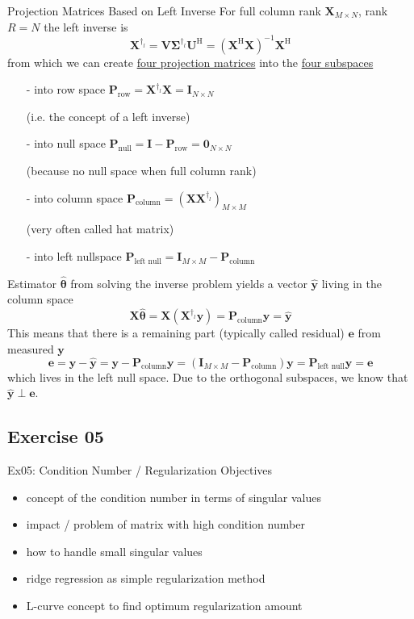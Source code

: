 \documentclass[mathserif, aspectratio=1610]{intbeamer}
\begin{document}
\begin{frame}{Projection Matrices Based on Left Inverse}
For full column rank $\bm{X}_{M \times N}$, rank $R=N$ the left inverse is
$$\bm{X}^{\dagger_l} = \bm{V} \bm{\Sigma}^{\dagger_l}\bm{U}^\mathrm{H} = (\bm{X}^\mathrm{H}\bm{X})^{-1} \bm{X}^\mathrm{H}$$
from which we can create \underline{four projection matrices} into the \underline{four subspaces}
\begin{itemize}
\item[-] into \textcolor{C2}{row space} $\bm{P}_\text{row} = \bm{X}^{\dagger_l} \bm{X} = \bm{I}_{N \times N}$ \begin{footnotesize}(i.e. the concept of a left inverse)\end{footnotesize}
\item[-] into \textcolor{C1}{null space} $\bm{P}_\text{null} = \bm{I} - \bm{P}_\text{row} = \bm{0}_{N \times N}$ \begin{footnotesize}(because no null space when full column rank)\end{footnotesize}
\item[-] into \textcolor{C0}{column space} $\bm{P}_\text{column} = (\bm{X} \bm{X}^{\dagger_l})_{M \times M}$ \begin{footnotesize}(very often called hat matrix)\end{footnotesize}
\item[-] into \textcolor{C4}{left nullspace} $\bm{P}_\text{left null} = \bm{I}_{M \times M} - \bm{P}_\text{column}$
\end{itemize}

Estimator $\hat{\bm{\theta}}$ from solving the inverse problem yields a vector $\hat{\bm{y}}$ living in the column space
$$\bm{X} \hat{\bm{\theta}} = \bm{X} (\bm{X}^{\dagger_l} \bm{y}) = \bm{P}_\text{column} \bm{y} = \hat{\bm{y}}$$
This means that there is a remaining part (typically called residual) $\bm{e}$ from measured $\bm{y}$
$$\bm{e} = \bm{y} - \hat{\bm{y}} = \bm{y} - \bm{P}_\text{column} \bm{y} = (\bm{I}_{M \times M} - \bm{P}_\text{column}) \bm{y}=
\bm{P}_\text{left null} \bm{y} = \bm{e}$$
which lives in the left null space. Due to the orthogonal subspaces, we know that $\hat{\bm{y}} \perp \bm{e}$.
\end{frame}



\subsection{Exercise 05}

\begin{frame}{Ex05: Condition Number / Regularization}
Objectives
\begin{itemize}
\item concept of the condition number in terms of singular values
\item impact / problem of matrix with high condition number
\item how to handle small singular values
\item ridge regression as simple regularization method
\item L-curve concept to find optimum regularization amount
\end{itemize}
\end{frame}
\end{document}
